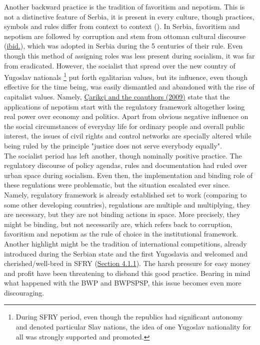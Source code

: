 \documentclass[11pt]{report}
\begin{document}
{Another backward practice is the tradition of favoritism and nepotism.
This is not a distinctive feature of Serbia, it is present in every culture, though practices, symbols and rules differ from context to context (\href{Çarikçi}{\cite{ÇarikçiEtAl.2009}}).
In Serbia, favoritism and nepotism are followed by corruption and stem from ottoman cultural discourse (\href{Çarikçi}{ibid.}), which was adopted in Serbia during the 5 centuries of their rule.
Even though this method of assigning roles was less present during socialism, it was far from eradicated.
However, the socialist that spread over the new country of Yugoslav nationals
\footnote{During SFRY period, even though the republics had significant autonomy and denoted particular Slav nations, the idea of one Yugoslav nationality for all was strongly supported and promoted.}
put forth egalitarian values, but its influence, even though effective for the time being, was  easily dismantled and abandoned with the rise of capitalist values.
Namely, \href{Çarikçi}{Çarikçi and the coauthors (2009)} state that the applications of nepotism start with the regulatory framework altogether losing real power over economy and politics.
Apart from obvious negative influence on the social circumstances of everyday life for ordinary people and overall public interest, the issues of civil rights and control networks are specially altered while being ruled by the principle "justice does not serve everybody equally".
\\

The socialist period has left another, though nominally positive practice.
The regulatory discourse of policy agendas, rules and documentation had ruled over urban space during socialism.
Even then, the implementation and binding role of these regulations were problematic, but the situation escalated ever since.
Namely, regulatory framework is already established set to work (comparing to some other developing countries), regulations are multiple and multiplying, they are necessary, but they are not binding actions in space. 
More precisely, they might be binding, but not necessarily are, which  refers back to corruption, favoritism and nepotism as the rule of choice in the institutional framework.
\\

Another highlight might be the tradition of international competitions, already introduced during the Serbian state and the first Yugoslavia and welcomed and cherished/well-bred in SFRY (\href{Section 4.1.1}{Section 4.1.1}).
The harsh pressure for easy money and profit have been threatening  to disband this good practice. Bearing in mind what happened with the BWP and BWPSPSP, this issue becomes even more discouraging.
\\

}
\end{document}
